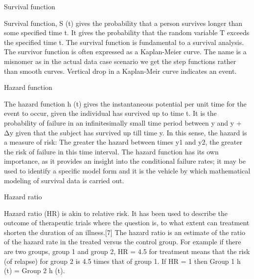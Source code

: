 Survival function

Survival function, S (t) gives the probability that a person survives longer than some specified time t. It gives the probability that the random variable T exceeds the specified time t. The survival function is fundamental to a survival analysis. The survivor function is often expressed as a Kaplan-Meier curve. The name is a misnomer as in the actual data case scenario we get the step functions rather than smooth curves. Vertical drop in a Kaplan-Meir curve indicates an event.

Hazard function

The hazard function h (t) gives the instantaneous potential per unit time for the event to occur, given the individual has survived up to time t. It is the probability of failure in an infinitesimally small time period between y and y + Δy given that the subject has survived up till time y. In this sense, the hazard is a measure of risk: The greater the hazard between times y1 and y2, the greater the risk of failure in this time interval. The hazard function has its own importance, as it provides an insight into the conditional failure rates; it may be used to identify a specific model form and it is the vehicle by which mathematical modeling of survival data is carried out.

Hazard ratio

Hazard ratio (HR) is akin to relative risk. It has been used to describe the outcome of therapeutic trials where the question is, to what extent can treatment shorten the duration of an illness.[7] The hazard ratio is an estimate of the ratio of the hazard rate in the treated versus the control group. For example if there are two groups, group 1 and group 2, HR = 4.5 for treatment means that the risk (of relapse) for group 2 is 4.5 times that of group 1. If HR = 1 then Group 1 h (t) = Group 2 h (t).

